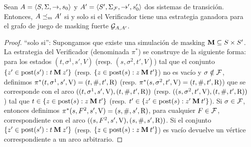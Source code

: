 \begin{thm} \label{thm:wingame_strat}
  Sean $A=\langle S, \Sigma, \rightarrow, s_0 \rangle$ y $A'=\langle S', \Sigma_{\mathcal{F}}, \rightarrow', s'_0 \rangle$ dos sistemas de transición.
  Entonces, $A \preceq_{m} A'$ si y solo si el Verificador tiene una estrategia ganadora para el grafo de juego de masking fuerte $\mathcal{G}_{A, A'}$.
\end{thm}
\begin{proof} 
	``solo si'': Supongamos que existe una simulación de masking $\mathbin{\mathbf{M}} \subseteq S \times S'$.
La estrategia del Verificador (denominada $\pi^*$) se construye de la siguiente forma:  para los estados $(t, \sigma^1, s', V)$ (resp. $(s, \sigma^2, t', V)$) tal que el conjunto $\{ z' \in \operatorname{post}(s'): t \mathbin{\mathbf{M}} z' \}$
(resp. $\{ z \in \operatorname{post}(s): z \mathbin{\mathbf{M}} t' \}$) no es vacío y $\sigma \notin \mathcal{F}$, definimos $\pi^*(t, \sigma^1, s', \mathrm{V}) = (t, \#, t', \mathrm{R})$ 
(resp. $\pi^*(s, \sigma^2, t', \mathrm{V}) = (t, \#, t', \mathrm{R})$) que se corresponde con el arco $((t, \sigma^1, s', \mathrm{V}), (t, \#, t', \mathrm{R}))$ (resp. $((s, \sigma^2, t', \mathrm{V}),(t, \#, t', \mathrm{R}))$) tal que $t \in \{ z \in \operatorname{post}(s): z \mathbin{\mathbf{M}} t' \}$ (resp. $t' \in \{ z' \in \operatorname{post}(s): z' \mathbin{\mathbf{M}} t' \}$).  Si $\sigma \in \mathcal{F}$, entonces definimos $\pi^*(s, F^2, s', \mathrm{V}) = (s, \#, s', \mathrm{R})$, para cualquier $F \in \mathcal{F}$, correspondiente con el arco $((s, F^2, s', \mathrm{V}),( s, \#, s', \mathrm{R}))$. Si el conjunto $\{ z' \in \operatorname{post}(s'): t \mathbin{\mathbf{M}} z' \}$  (resp. $\{ z \in \operatorname{post}(s): z \mathbin{\mathbf{M}} t' \}$) 
es vacío devuelve un vértice correspondiente a un arco arbitrario. 


\end{proof}

